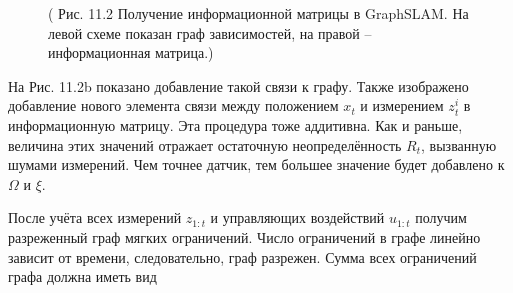 \documentclass[10pt,a4paper]{article}
\begin{document}
\begin{figure}[H]
	\caption{ ( Рис. 11.2 Получение информационной матрицы в GraphSLAM. На левой схеме показан граф зависимостей, на правой – информационная матрица.)}
	\label{fig:112orig}
\end{figure}

На Рис. 11.2b показано добавление такой связи к графу. Также изображено добавление нового элемента связи между положением $x_t$ и измерением $z_t^i$ в информационную матрицу. Эта процедура тоже аддитивна. Как и раньше, величина этих значений отражает остаточную неопределённость $R_t$, вызванную шумами измерений.  Чем точнее датчик, тем большее значение будет добавлено к $\varOmega$ и $\xi$.

После учёта всех измерений $z_{1:t}$ и управляющих воздействий $u_{1:t}$ получим разреженный граф мягких ограничений. Число ограничений в графе линейно зависит от времени, следовательно, граф разрежен. Сумма всех ограничений графа должна иметь вид\\
\end{document}
